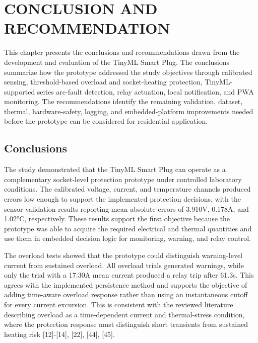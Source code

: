 \chapter{CONCLUSION AND RECOMMENDATION}\label{chap:conclusion-recommendation}

This chapter presents the conclusions and recommendations drawn from the
development and evaluation of the TinyML Smart Plug. The conclusions
summarize how the prototype addressed the study objectives through calibrated
sensing, threshold-based overload and socket-heating protection, TinyML-supported
series arc-fault detection, relay actuation, local notification, and PWA monitoring.
The recommendations identify the remaining validation, dataset, thermal,
hardware-safety, logging, and embedded-platform improvements needed before the
prototype can be considered for residential application.

\section{Conclusions}\label{sec:conclusions}

The study demonstrated that the TinyML Smart Plug can operate as a
complementary socket-level protection prototype under controlled laboratory
conditions. The calibrated voltage, current, and temperature channels produced
errors low enough to support the implemented protection decisions, with the
sensor-validation results reporting mean absolute errors of 3.910V, 0.178A, and
1.02°C, respectively. These results support the first objective because the
prototype was able to acquire the required electrical and thermal quantities and
use them in embedded decision logic for monitoring, warning, and relay control.

The overload tests showed that the prototype could distinguish warning-level
current from sustained overload. All overload trials generated warnings, while
only the trial with a 17.30A mean current produced a relay trip after 61.3s.
This agrees with the implemented persistence method and supports the objective
of adding time-aware overload response rather than using an instantaneous
cutoff for every current excursion. This is consistent with the reviewed
literature describing overload as a time-dependent current and thermal-stress
condition, where the protection response must distinguish short transients from
sustained heating risk [12]-[14], [22], [44], [45].


